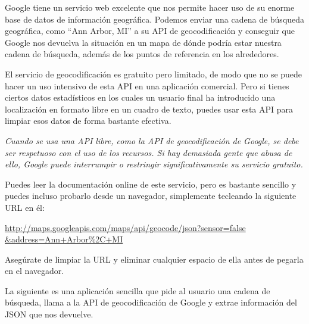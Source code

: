 Google tiene un servicio web excelente que nos permite hacer uso de su
enorme base de datos de información geográfica. Podemos enviar una cadena de búsqueda
geográfica, como ``Ann Arbor, MI'' a su API de geocodificación y conseguir que Google
nos devuelva la situación en un mapa de dónde podría estar nuestra cadena de
búsqueda, además de los puntos de referencia en los alrededores.

El servicio de geocodificación es gratuito pero limitado, de modo que no se puede hacer
un uso intensivo de esta API en una aplicación comercial. Pero si tienes ciertos datos
estadísticos en los cuales un usuario final ha introducido una localización en formato
libre en un cuadro de texto, puedes usar esta API para limpiar esos datos de forma
bastante efectiva.

{\em Cuando se usa una API libre, como la API de geocodificación de Google, se debe ser
respetuoso con el uso de los recursos. Si hay demasiada gente que abusa de ello,
Google puede interrumpir o restringir significativamente su servicio gratuito.}

Puedes leer la documentación online de este servicio, pero es bastante sencillo
y puedes incluso probarlo desde un navegador, simplemente tecleando la siguiente URL
en él:

\url{http://maps.googleapis.com/maps/api/geocode/json?sensor=false &address=Ann+Arbor%2C+MI}

Asegúrate de limpiar la URL y eliminar cualquier espacio de ella antes de pegarla
en el navegador.

La siguiente es una aplicación sencilla que pide al usuario una cadena de búsqueda,
llama a la API de geocodificación de Google y extrae información del JSON que nos devuelve.

